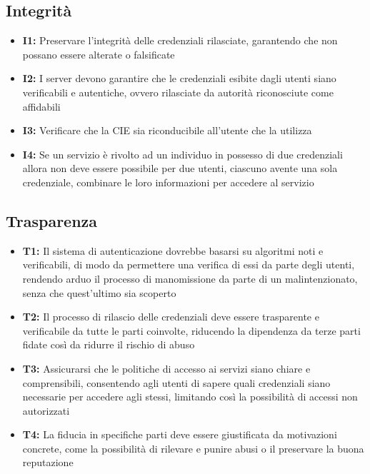         \subsection{Integrità}
            \begin{itemize}
                    \item \textbf{I1:} Preservare l'integrità delle credenziali rilasciate, garantendo che non possano essere alterate o falsificate
                
                \item \textbf{I2:} I server devono garantire che le credenziali esibite dagli utenti siano verificabili e autentiche, ovvero rilasciate da autorità riconosciute come affidabili
    
                \item \textbf{I3:} Verificare che la CIE sia riconducibile all'utente che la utilizza
                
                \item \textbf{I4:} Se un servizio è rivolto ad un individuo in possesso di due credenziali allora non deve essere possibile per due utenti, ciascuno avente una sola credenziale, combinare le loro informazioni per accedere al servizio
            \end{itemize}
    
        \subsection{Trasparenza}
            \begin{itemize}
                \item \textbf{T1:} Il sistema di autenticazione dovrebbe basarsi su algoritmi noti e verificabili, di modo da permettere una verifica di essi da parte degli utenti, rendendo arduo il processo di manomissione da parte di un malintenzionato, senza che quest'ultimo sia scoperto
            
                \item \textbf{T2:} Il processo di rilascio delle credenziali deve essere trasparente e verificabile da tutte le parti coinvolte, riducendo la dipendenza da terze parti fidate così da ridurre il rischio di abuso   
                
                \item \textbf{T3:} Assicurarsi che le politiche di accesso ai servizi siano chiare e comprensibili, consentendo agli utenti di sapere quali credenziali siano necessarie per accedere agli stessi, limitando così la possibilità di accessi non autorizzati
    
                \item \textbf{T4:} La fiducia in specifiche parti deve essere giustificata da motivazioni concrete, come la possibilità di rilevare e punire abusi o il preservare la buona reputazione
            \end{itemize}
    
